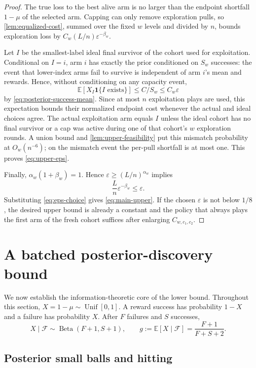 \documentclass[11pt,letterpaper]{article}
\numberwithin{equation}{section}
\theoremstyle{definition}
\theoremstyle{remark}
\newcommand{\E}{\mathbb{E}}
\newcommand{\1}{\mathbf{1}}
\newcommand{\F}{\mathcal{F}}
\newcommand{\eps}{\varepsilon}
\newcommand{\BetaDist}{\operatorname{Beta}}
\newcommand{\Unif}{\operatorname{Unif}}
\begin{document}
\begin{proof}
The true loss to the best alive arm is no larger than the endpoint shortfall
$1-\mu$ of the selected arm.  Capping can only remove exploration pulls, so
\cref{lem:equalized-cost}, summed over the fixed $w$ levels and divided by $n$,
bounds exploration loss by
$C_w(L/n)\eps^{-\beta_w}$.

Let $I$ be the smallest-label ideal final survivor of the cohort used for
exploitation.
Conditional on $I=i$, arm $i$ has exactly the prior conditioned on $S_w$
successes: the event that lower-index arms fail to survive is independent of
arm $i$'s mean and rewards.  Hence, without conditioning on any capacity event,
\[
  \E[X_I\1\{I\text{ exists}\}]\le C/S_w\le C_w\eps
\]
by \cref{eq:posterior-success-mean}. Since at most $n$ exploitation plays
are used, this expectation bounds their normalized endpoint cost whenever
the actual and ideal choices agree. The actual exploitation arm equals $I$
unless the ideal cohort has no final survivor or a cap was active during one of
that cohort's $w$ exploration rounds.  A union bound and
\cref{lem:upper-feasibility} put this mismatch probability at $O_w(n^{-6})$;
on the mismatch event the per-pull shortfall is at most one.  This proves
\cref{eq:upper-eps}.

Finally, $\alpha_w(1+\beta_w)=1$.  Hence
$\eps\ge(L/n)^{\alpha_w}$ implies
\[
  \frac{L}{n}\eps^{-\beta_w}\le\eps.
\]
Substituting \cref{eq:eps-choice} gives \cref{eq:main-upper}.  If the chosen
$\eps$ is not below $1/8$, the desired upper bound is already a constant and the
policy that always plays the first arm of the fresh cohort suffices after
enlarging $C_{w,c_1,c_2}$.
\end{proof}

\section{A batched posterior-discovery bound}\label{sec:discovery}

We now establish the information-theoretic core of the lower bound.  Throughout
this section, $X=1-\mu\sim\Unif[0,1]$.  A reward success has probability $1-X$
and a failure has probability $X$.  After $F$ failures and $S$ successes,
\[
  X\mid\F\sim\BetaDist(F+1,S+1),
  \qquad
  g:=\E[X\mid\F]=\frac{F+1}{F+S+2}.
\]

\subsection{Posterior small balls and hitting}
\end{document}
